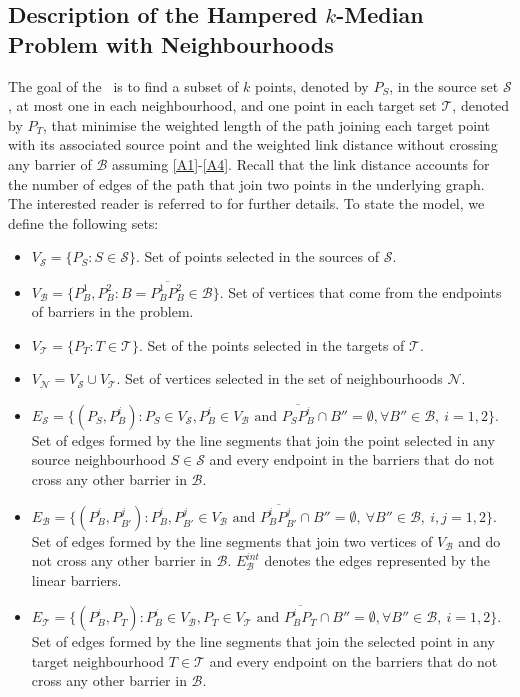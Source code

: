 \documentclass[a4paper,  review, authoryear, 1p.]{elsarticle}
\newcommand{\KMPHN}{{\sf{H-KMPHN}}}
\newcommand{\B}{{\mathcal B}}
\newcommand{\VB}{{V^{}_{\mathcal B}}}
\newcommand{\EB}{{E^{}_{\mathcal B}}}
\newcommand{\EBint}{{E^{int}_{\mathcal B}}}
\newcommand{\VS}{{V^{}_{\mathcal S}}}
\newcommand{\ES}{{E^{}_{\mathcal S}}}
\newcommand{\VT}{{V^{}_{\mathcal T}}}
\newcommand{\ET}{{E^{}_{\mathcal T}}}
\newcommand{\VN}{{V^{}_{\mathcal N}}}
\begin{document}
	\subsection{Description of the Hampered $k$-Median Problem with Neighbourhoods}\label{subsection:descriptionKMPN}
	
	The goal of the \KMPHN \ is to find a subset of $k$ points, denoted by $P_S$, in the source set $\mathcal S$, at most one in each neighbourhood, and one point in each target set $\mathcal T$, denoted by $P_T$, that minimise the weighted length of the path joining each target point with its associated source point and the weighted link distance without crossing any barrier of $\mathcal B$ assuming \ref{A1}-\ref{A4}. Recall that the link distance accounts for the number of edges of the path that join two points in the underlying graph. The interested reader is referred to \citet{deberg1990,daescu2008} for further details. To state the model, we define the following sets:
	\begin{itemize}
		\item $\VS=\{P_S:S\in\mathcal S\}$. Set of points selected in the sources of $\mathcal S$.
		\item $\VB=\{P^1_B, P^2_B:B=\overline{P^1_B P^2_B}\in \mathcal B\}$. Set of vertices that come from the endpoints of barriers in the problem.
		\item $\VT=\{P^{}_T:T\in\mathcal T\}$. Set of the points selected in the targets of $\mathcal T$.
		\item $\VN=\VS\cup\VT$. Set of vertices selected in the set of neighbourhoods $\mathcal N$.
		\item $\ES=\{(P_S, P^i_{B}):P_S\in\VS, P^i_B\in V_\B\text{ and } \overline{P_SP^i_B}\cap B''=\emptyset,\forall B''\in\B,\:i=1,2\}$. Set of edges formed by the line segments that join the point selected in any source neighbourhood $S\in \mathcal{S}$ and every endpoint in the barriers that do not cross any other barrier in $\B$.
		\item $\EB=\{(P^{i}_B, P^{j}_{B'}):P^i_B, P^j_{B'}\in \VB \text{ and } \overline{P^i_B P^j_{B'}}\cap B''=\emptyset,\:\forall B''\in\mathcal B,\:i, j=1,2\}$. Set of edges formed by the line segments that join two vertices of $V_{\mathcal B}$ and do not cross any other barrier in $\B$. $\EBint$ denotes the edges represented by the linear barriers.
		\item $\ET=\{(P^i_{B}, P^{}_T):P^i_B\in V_\B, P_T\in\VT\text{ and } \overline{P^i_BP^{}_T}\cap B''=\emptyset,\forall B''\in\B,\:i=1,2\}$. Set of edges formed by the line segments that join the selected point in any target neighbourhood $T\in \mathcal{T}$ and every endpoint on the barriers that do not cross any other barrier in $\B$.

	\end{itemize} 
	
\end{document}
